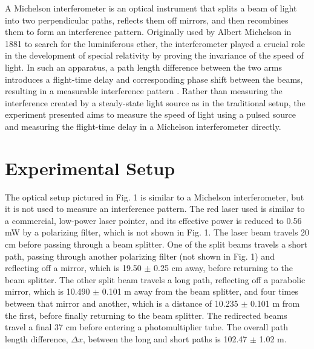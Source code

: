\documentclass[%
 reprint,
 amsmath,amssymb,
 aps,
]{revtex4-2}
\begin{document}
A Michelson interferometer is an optical instrument that splits a beam of light into two perpendicular paths, reflects them off mirrors, and then recombines them to form an interference pattern. Originally used by Albert Michelson in 1881 to search for the luminiferous ether, the interferometer played a crucial role in the development of special relativity by proving the invariance of the speed of light. In such an apparatus, a path length difference between the two arms introduces a flight-time delay and corresponding phase shift between the beams, resulting in a measurable interference pattern \cite{french}\cite{Michelson1881relative}\cite{Michelson1887On}. Rather than measuring the interference created by a steady-state light source as in the traditional setup, the experiment presented aims to measure the speed of light using a pulsed source and measuring the flight-time delay in a Michelson interferometer directly. 



\section{Experimental Setup}

The optical setup pictured in Fig. 1 is similar to a Michelson interferometer, but it is not used to measure an interference pattern. The red laser used is similar to a commercial, low-power laser pointer, and its effective power is reduced to 0.56 mW by a polarizing filter, which is not shown in Fig. 1. The laser beam travels 20 cm before passing through a beam splitter. One of the split beams travels a short path, passing through another polarizing filter (not shown in Fig. 1) and reflecting off a mirror, which is 19.50 $\pm$ 0.25 cm away, before returning to the beam splitter. The other split beam travels a long path, reflecting off a parabolic mirror, which is 10.490 $\pm$ 0.101 m away from the beam splitter, and four times between that mirror and another, which is a distance of 10.235 $\pm$ 0.101 m from the first, before finally returning to the beam splitter. The redirected beams travel a final 37 cm before entering a photomultiplier tube. The overall path length difference, $\Delta x$, between the long and short paths is 102.47 $\pm$ 1.02 m. 
\end{document}
